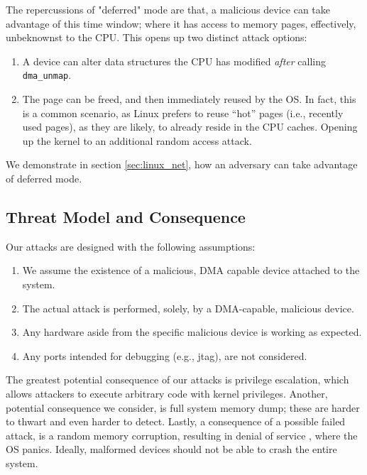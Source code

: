 The repercussions of "deferred" mode are that, a malicious device can take advantage of this time window; where it has access to memory pages, effectively, unbeknownst to the CPU. This opens up two distinct attack options:
\begin{enumerate}
    \item A device can alter data structures the CPU has modified \emph{after} calling \texttt{dma\_unmap}.
    \item The page can be freed, and then immediately reused by the OS. In fact, this is a common scenario, as Linux prefers to reuse “hot” pages (i.e., recently used pages), as they are likely, to already reside in the CPU caches\cite{hotcold}. Opening up the kernel to an additional random access attack.
\end{enumerate}

We demonstrate in section \ref{sec:linux_net}, how an adversary can take advantage of deferred mode.

\subsection{Threat Model and Consequence}
Our attacks are designed with the following assumptions:
\begin{enumerate}
    \item We assume the existence of a malicious, DMA capable device attached to the system.
    \item The actual attack is performed, solely, by a DMA-capable, malicious device.
    \item Any hardware aside from the specific malicious device is working as expected.
    \item Any ports intended for debugging (e.g., jtag), are not considered.
 \end{enumerate}

The greatest potential consequence of our attacks is privilege escalation, which allows attackers to execute arbitrary code with kernel privileges. Another, potential consequence we consider, is full system memory dump; these are harder to thwart and even harder to detect.  
Lastly, a consequence of a possible failed attack, is a random memory corruption, resulting in denial of service \cite{MMT16}, where the OS panics. Ideally, malformed devices should not be able to crash the entire system. 